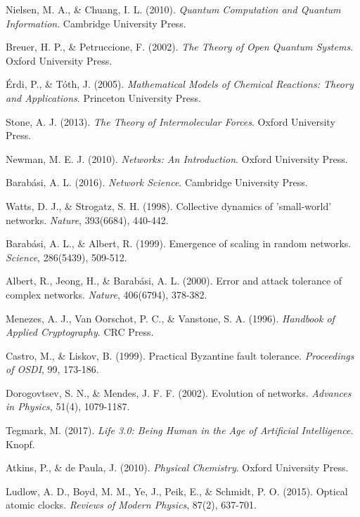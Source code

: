 \documentclass[12pt,a4paper]{article}
\begin{document}
\begin{thebibliography}{99}
Nielsen, M. A., \& Chuang, I. L. (2010). \textit{Quantum Computation and Quantum Information}. Cambridge University Press.

Breuer, H. P., \& Petruccione, F. (2002). \textit{The Theory of Open Quantum Systems}. Oxford University Press.

Érdi, P., \& Tóth, J. (2005). \textit{Mathematical Models of Chemical Reactions: Theory and Applications}. Princeton University Press.

Stone, A. J. (2013). \textit{The Theory of Intermolecular Forces}. Oxford University Press.

Newman, M. E. J. (2010). \textit{Networks: An Introduction}. Oxford University Press.

Barabási, A. L. (2016). \textit{Network Science}. Cambridge University Press.

Watts, D. J., \& Strogatz, S. H. (1998). Collective dynamics of 'small-world' networks. \textit{Nature}, 393(6684), 440-442.

Barabási, A. L., \& Albert, R. (1999). Emergence of scaling in random networks. \textit{Science}, 286(5439), 509-512.

Albert, R., Jeong, H., \& Barabási, A. L. (2000). Error and attack tolerance of complex networks. \textit{Nature}, 406(6794), 378-382.

Menezes, A. J., Van Oorschot, P. C., \& Vanstone, S. A. (1996). \textit{Handbook of Applied Cryptography}. CRC Press.

Castro, M., \& Liskov, B. (1999). Practical Byzantine fault tolerance. \textit{Proceedings of OSDI}, 99, 173-186.

Dorogovtsev, S. N., \& Mendes, J. F. F. (2002). Evolution of networks. \textit{Advances in Physics}, 51(4), 1079-1187.

Tegmark, M. (2017). \textit{Life 3.0: Being Human in the Age of Artificial Intelligence}. Knopf.

Atkins, P., \& de Paula, J. (2010). \textit{Physical Chemistry}. Oxford University Press.

Ludlow, A. D., Boyd, M. M., Ye, J., Peik, E., \& Schmidt, P. O. (2015). Optical atomic clocks. \textit{Reviews of Modern Physics}, 87(2), 637-701.


\end{thebibliography}
\end{document}
